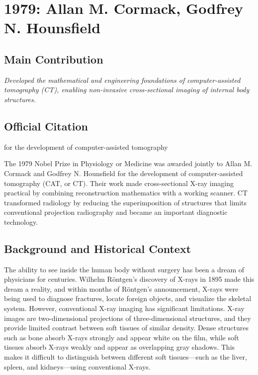 \chapter[1979 --- Cormack et al.]{1979: Allan M. Cormack, Godfrey N. Hounsfield}
\label{ch:1979_Cormack}

\section*{Main Contribution}

\textit{Developed the mathematical and engineering foundations of computer-assisted tomography (CT), enabling non-invasive cross-sectional imaging of internal body structures.}\cite{nobel-1979,lecture-1979,lecture-hounsfield-1979}

\section{Official Citation}

for the development of computer-assisted tomography

The 1979 Nobel Prize in Physiology or Medicine was awarded jointly to Allan M. Cormack and Godfrey N. Hounsfield for the development of computer-assisted tomography (CAT, or CT). Their work made cross-sectional X-ray imaging practical by combining reconstruction mathematics with a working scanner. CT transformed radiology by reducing the superimposition of structures that limits conventional projection radiography and became an important diagnostic technology.

\section{Background and Historical Context}

The ability to see inside the human body without surgery has been a dream of physicians for centuries. Wilhelm R\"ontgen's discovery of X-rays in 1895 made this dream a reality, and within months of R\"ontgen's announcement, X-rays were being used to diagnose fractures, locate foreign objects, and visualize the skeletal system. However, conventional X-ray imaging has significant limitations. X-ray images are two-dimensional projections of three-dimensional structures, and they provide limited contrast between soft tissues of similar density. Dense structures such as bone absorb X-rays strongly and appear white on the film, while soft tissues absorb X-rays weakly and appear as overlapping gray shadows. This makes it difficult to distinguish between different soft tissues---such as the liver, spleen, and kidneys---using conventional X-rays.


